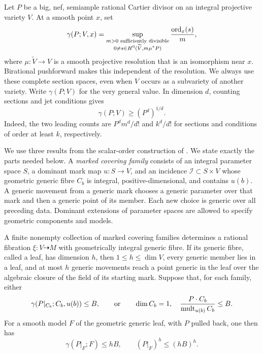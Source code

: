Let $P$ be a big, nef, semiample rational Cartier divisor on an integral
projective variety $V$.  At a smooth point $x$, set
\[
 \gamma(P;V,x)=
 \sup_{\substack{m>0\text{ sufficiently divisible}\\
                 0\ne s\in H^0(\widetilde V,m\mu^*P)}}
                         \frac{\operatorname{ord}_x(s)}m,
\]
where $\mu:\widetilde V\to V$ is a smooth projective resolution that is
an isomorphism near $x$.  Birational pushforward makes this independent
of the resolution.  We always use these complete section spaces, even
when $V$ occurs as a subvariety of another variety.  Write
$\gamma(P;V)$ for the very general value.  In dimension $d$, counting
sections and jet conditions gives
\begin{equation}\label{eq:rank:order-volume}
                         \gamma(P;V)\ge(P^d)^{1/d}.
\end{equation}
Indeed, the two leading counts are $P^d m^d/d!$ and $k^d/d!$ for
sections and conditions of order at least $k$, respectively.

We use three results from the scalar-order construction of
\citet[Section ``Scalar order and curve estimates'']{UPI}.  We state
exactly the parts needed below.  A \emph{marked covering family} consists
of an integral parameter space $S$, a dominant mark map $u:S\to V$,
and an incidence $\mathcal I\subset S\times V$ whose geometric generic
fibre $C_b$ is integral, positive-dimensional, and contains $u(b)$.
A generic movement from a generic mark chooses a generic parameter over
that mark and then a generic point of its member.  Each new choice is
generic over all preceding data.  Dominant extensions of parameter
spaces are allowed to specify geometric components and models.

\begin{externalinput}\label{input:rank:chains}
A finite nonempty collection of marked covering families determines a
rational fibration $\xi:V\dashrightarrow M$ with geometrically integral
generic fibre.  If its generic fibre, called a leaf, has dimension $h$,
then $1\le h\le\dim V$, every generic member lies in a leaf, and at most
$h$ generic movements reach a point generic in the leaf over the
algebraic closure of the field of its starting mark.  Suppose that,
for each family, either
\[
 \gamma(P|_{C_b};C_b,u(b))\le B,
 \qquad\text{or}\qquad
 \dim C_b=1,\quad
 \frac{P\cdot C_b}{\operatorname{mult}_{u(b)}C_b}\le B.
\]
For a smooth model $F$ of the geometric generic leaf, with $P$ pulled
back, one then has
\begin{equation}\label{eq:rank:chain-bound}
                  \gamma(P|_F;F)\le hB,
                  \qquad (P|_F)^h\le(hB)^h.
\end{equation}
\end{externalinput}

